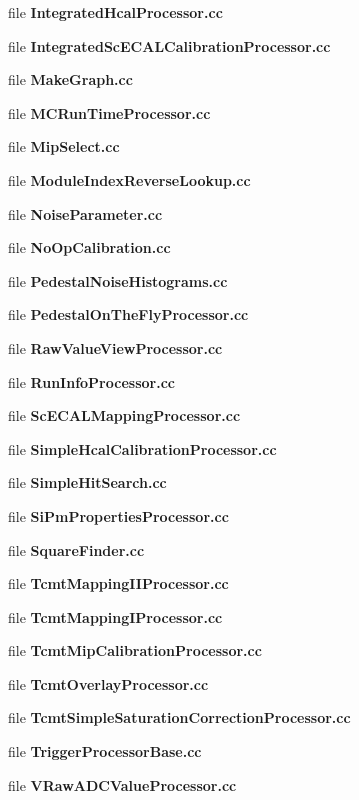 \begin{DoxyCompactItemize}
file {\bfseries Integrated\-Hcal\-Processor.\-cc}
\item 
file {\bfseries Integrated\-Sc\-E\-C\-A\-L\-Calibration\-Processor.\-cc}
\item 
file {\bfseries Make\-Graph.\-cc}
\item 
file {\bfseries M\-C\-Run\-Time\-Processor.\-cc}
\item 
file {\bfseries Mip\-Select.\-cc}
\item 
file {\bfseries Module\-Index\-Reverse\-Lookup.\-cc}
\item 
file {\bfseries Noise\-Parameter.\-cc}
\item 
file {\bfseries No\-Op\-Calibration.\-cc}
\item 
file {\bfseries Pedestal\-Noise\-Histograms.\-cc}
\item 
file {\bfseries Pedestal\-On\-The\-Fly\-Processor.\-cc}
\item 
file {\bfseries Raw\-Value\-View\-Processor.\-cc}
\item 
file {\bfseries Run\-Info\-Processor.\-cc}
\item 
file {\bfseries Sc\-E\-C\-A\-L\-Mapping\-Processor.\-cc}
\item 
file {\bfseries Simple\-Hcal\-Calibration\-Processor.\-cc}
\item 
file {\bfseries Simple\-Hit\-Search.\-cc}
\item 
file {\bfseries Si\-Pm\-Properties\-Processor.\-cc}
\item 
file {\bfseries Square\-Finder.\-cc}
\item 
file {\bfseries Tcmt\-Mapping\-I\-I\-Processor.\-cc}
\item 
file {\bfseries Tcmt\-Mapping\-I\-Processor.\-cc}
\item 
file {\bfseries Tcmt\-Mip\-Calibration\-Processor.\-cc}
\item 
file {\bfseries Tcmt\-Overlay\-Processor.\-cc}
\item 
file {\bfseries Tcmt\-Simple\-Saturation\-Correction\-Processor.\-cc}
\item 
file {\bfseries Trigger\-Processor\-Base.\-cc}
\item 
file {\bfseries V\-Raw\-A\-D\-C\-Value\-Processor.\-cc}
\end{DoxyCompactItemize}
